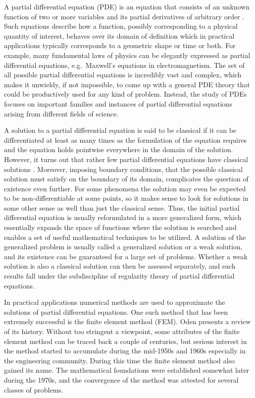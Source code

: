 \documentclass[english, 12pt, a4paper, sci, utf8, a-2b, online]{aaltothesis}
\theoremstyle{definition}
\theoremstyle{plain}
\numberwithin{equation}{section}
\begin{document}
\thispagestyle{empty}
A partial differential equation (PDE) is an equation that consists of an
unknown function of two or more variables and its partial derivatives of
arbitrary order \cite{evans2010}.
Such equations describe how a function, possibly corresponding to a physical
quantity of interest, behaves over its domain of definition
which in practical applications typically corresponds to a geometric shape or
time or both. For example, many fundamental laws of physics can be elegantly
expressed as partial differential equations, e.g.\ Maxwell's equations
in electromagnetism.
The set of all possible partial differential equations is incredibly vast and
complex, which makes it unwieldy, if not impossible,
to come up with a general PDE theory that could be productively used for any kind
of problem. Instead, the study of PDEs focuses on important families
and instances of partial differential equations arising from
different fields of science.

A solution to a partial differential equation is said to be classical if it
can be differentiated at least as many times as the formulation of the equation
requires and the equation holds pointwise everywhere in the domain of the solution.
However, it turns out that rather few partial differential equations
have classical solutions \cite{evans2010}. Moreover, imposing boundary conditions,
that the possible classical solution must satisfy on the boundary of its domain,
complicates the question of existence even further.
For some phenomena the solution may even be expected to be non-differentiable
at some points, so it makes sense to look for solutions in some other sense as well
than just the classical sense. Thus, the initial partial differential equation is
usually reformulated in a more generalized form, which essentially expands
the space of functions where the solution is searched and enables a set of useful
mathematical techniques to be utilized. A solution of the
generalized problem is usually called a generalized solution or a weak solution,
and its existence can be guaranteed for a large set of problems.
Whether a weak solution is also a classical solution can then be
assessed separately, and such results fall under the subdiscipline of
regularity theory of partial differential equations.

In practical applications numerical methods are used to approximate the
solutions of partial differential equations. One such method that has been
extremely successful is the finite element method (FEM). Oden \cite{oden1991}
presents a review of its history.
Without too stringent a viewpoint, some attributes 
of the finite element method can be traced back a couple of centuries, but serious
interest in the method started to accumulate during the mid-1950s and 1960s
especially in the engineering community. During this time the finite element method 
also gained its name. The mathematical foundations were established somewhat
later during the 1970s, and the convergence of the method was attested for several
classes of problems.
\end{document}
